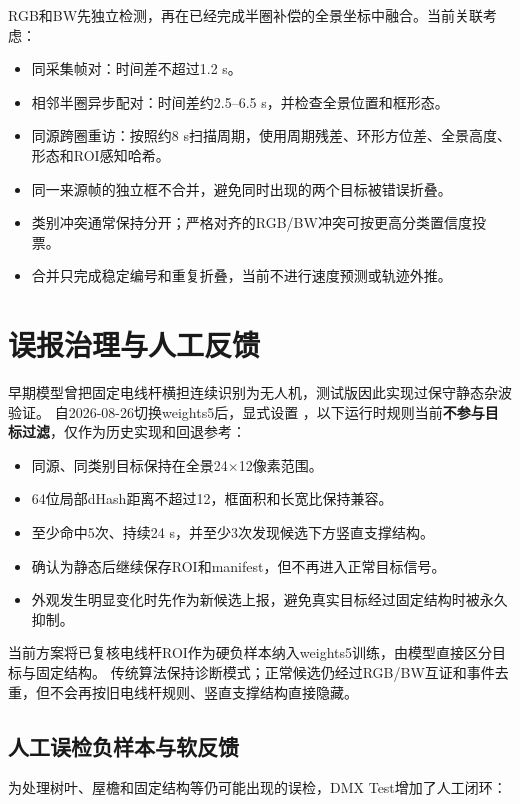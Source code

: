 \documentclass[UTF8,a4paper,11pt,openany]{ctexrep}
\begin{document}
RGB和BW先独立检测，再在已经完成半圈补偿的全景坐标中融合。当前关联考虑：

\begin{itemize}
  \item 同采集帧对：时间差不超过1.2 s。
  \item 相邻半圈异步配对：时间差约2.5--6.5 s，并检查全景位置和框形态。
  \item 同源跨圈重访：按照约8 s扫描周期，使用周期残差、环形方位差、全景高度、形态和ROI感知哈希。
  \item 同一来源帧的独立框不合并，避免同时出现的两个目标被错误折叠。
  \item 类别冲突通常保持分开；严格对齐的RGB/BW冲突可按更高分类置信度投票。
  \item 合并只完成稳定编号和重复折叠，当前不进行速度预测或轨迹外推。
\end{itemize}

\section{误报治理与人工反馈}

早期模型曾把固定电线杆横担连续识别为无人机，测试版因此实现过保守静态杂波验证。
自2026-08-26切换weights5后，显式设置
，以下运行时规则当前\textbf{不参与目标过滤}，仅作为历史实现和回退参考：

\begin{itemize}
  \item 同源、同类别目标保持在全景24$\times$12像素范围。
  \item 64位局部dHash距离不超过12，框面积和长宽比保持兼容。
  \item 至少命中5次、持续24 s，并至少3次发现候选下方竖直支撑结构。
  \item 确认为静态后继续保存ROI和manifest，但不再进入正常目标信号。
  \item 外观发生明显变化时先作为新候选上报，避免真实目标经过固定结构时被永久抑制。
\end{itemize}

当前方案将已复核电线杆ROI作为硬负样本纳入weights5训练，由模型直接区分目标与固定结构。
传统算法保持诊断模式；正常候选仍经过RGB/BW互证和事件去重，但不会再按旧电线杆规则、竖直支撑结构直接隐藏。

\subsection{人工误检负样本与软反馈}

为处理树叶、屋檐和固定结构等仍可能出现的误检，DMX Test增加了人工闭环：
\end{document}
